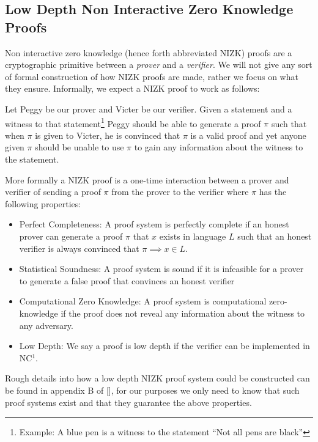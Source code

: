 \documentclass[12pt,twoside]{reedthesis}
\begin{document}
       \subsection{Low Depth Non Interactive Zero Knowledge Proofs}
       
       Non interactive zero knowledge (hence forth abbreviated NIZK) proofs are a cryptographic primitive between a \textit{prover} and a \textit{verifier}. We will not give any sort of formal construction of how NIZK proofs are made, rather we focus on what they ensure. Informally, we expect a NIZK proof to work as follows:
       \par Let Peggy be our prover and Victer be our verifier. Given a statement and a witness to that statement\footnote{Example: A blue pen is a witness to the statement ``Not all pens are black''} Peggy should be able to generate a proof $\pi$ such that when $\pi$ is given to Victer, he is convinced that $\pi$ is a valid proof and yet anyone given $\pi$ should be unable to use $\pi$ to gain any information about the witness to the statement.
       \par More formally a NIZK proof is a one-time interaction between a prover and verifier of sending a proof $\pi$ from the prover to the verifier where $\pi$ has the following properties:
       \begin{itemize}
       \item Perfect Completeness: A proof system is perfectly complete if an honest prover can generate a proof $\pi$ that $x$ exists in language $L$ such that an honest verifier is always convinced that $\pi \implies x\in L$.
       \item Statistical Soundness: A proof system is sound if it is infeasible for a prover to generate a false proof that convinces an honest verifier
       \item Computational Zero Knowledge: A proof system is computational zero-knowledge if the proof does not reveal any information about the witness to any adversary.
       \item Low Depth: We say a proof is low depth if the verifier can be implemented in NC$^1$.
         \end{itemize}
    
    
    \par Rough details into how a low depth NIZK proof system could be constructed can be found in appendix B of [\cite{Garg:2013}], for our purposes we only need to know that such proof systems exist and that they guarantee the above properties.
    
\end{document}
